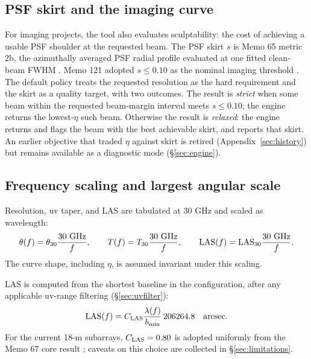 \documentclass[11pt]{article}
\begin{document}
\subsection{PSF skirt and the imaging curve}
\label{sec:skirt}

For imaging projects, the tool also evaluates sculptability: the cost of
achieving a usable PSF shoulder at the requested beam.  The PSF skirt $s$ is
Memo 65 metric 2b, the azimuthally averaged PSF radial profile evaluated at
one fitted clean-beam FWHM \cite{memo65}.  Memo 121 adopted $s \le 0.10$ as
the nominal imaging threshold \cite{memo121}.  The default policy treats
the requested resolution as the hard requirement and the skirt as a quality
target, with two outcomes.  The result is \emph{strict} when some beam
within the requested beam-margin interval meets $s \le 0.10$; the engine
returns the lowest-$\eta$ such beam.  Otherwise the result is \emph{relaxed}: the engine returns and
flags the beam with the best achievable skirt, and reports that skirt.  An
earlier objective that traded $\eta$ against skirt is retired
(Appendix~\ref{sec:history}) but remains available as a diagnostic mode
(\S\ref{sec:engine}).

\subsection{Frequency scaling and largest angular scale}
\label{sec:scaling}

Resolution, uv taper, and LAS are tabulated at 30 GHz and scaled as wavelength:
\begin{equation}
  \theta(f) = \theta_{30}{30~{\rm GHz}\over f}, \qquad
  T(f) = T_{30}{30~{\rm GHz}\over f}, \qquad
  {\rm LAS}(f) = {\rm LAS}_{30}{30~{\rm GHz}\over f}.
\end{equation}
The curve shape, including $\eta$, is assumed invariant under this scaling.

LAS is computed from the shortest baseline in the configuration, after any
applicable uv-range filtering (\S\ref{sec:uvfilter}):
\begin{equation}
  {\rm LAS}(f) =
  C_{\rm LAS}{\lambda(f)\over b_{\min}}\,206264.8\quad{\rm arcsec}.
\end{equation}
For the current 18-m subarrays, $C_{\rm LAS}=0.80$ is adopted uniformly from
the Memo 67 core result \cite{memo67}; caveats on this choice are collected
in \S\ref{sec:limitations}.
\end{document}
